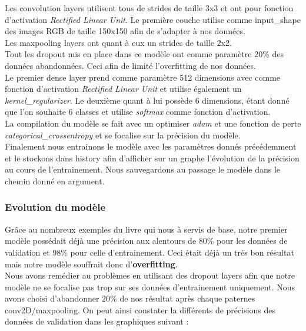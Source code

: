 \documentclass[12pt ,a4paper ]{article}
\begin{document}
\begin{multicols}{2}
Les convolution layers utilisent tous de strides de taille 3x3 et ont pour fonction d'activation \textit{Rectified Linear Unit}. Le première couche utilise comme input\_shape des images RGB de taille 150x150 afin de s'adapter à nos données.\\
Les maxpooling layers ont quant à eux un strides de taille 2x2.\\
Tout les dropout mis en place dans ce modèle ont comme paramètre 20\% des données abandonnées. Ceci afin de limité l'overfitting de nos données. \\
Le premier dense layer prend comme paramètre 512 dimensions avec comme fonction d'activation \textit{Rectified Linear Unit} et utilise également un \textit{kernel\_regularizer}. Le deuxième quant à lui possède 6 dimensions, étant donné que l'on souhaite 6 classes et utilise \textit{softmax} comme fonction d'activation. \\

La compilation du modèle se fait avec un optimiser \textit{adam} et une fonction de perte \textit{categorical\_crossentropy} et se focalise sur la précision du modèle. \\

Finalement nous entrainons le modèle avec les paramètres donnés précédemment et le stockons dans history afin d'afficher sur un graphe l'évolution de la précision au cours de l'entrainement. Nous sauvegardons au passage le modèle dans le chemin donné en argument. 

\subsubsection{Evolution du modèle}
Grâce au nombreux exemples du livre qui nous à servis de base, notre premier modèle possédait déjà une précision aux alentours de 80\% pour les données de validation et 98\% pour celle d'entrainement. Ceci était déjà un très bon résultat mais notre modèle souffrait donc d'\textbf{overfitting}.\\

Nous avons remédier au problèmes en utilisant des dropout layers afin que notre modèle ne se focalise pas trop sur ses données d'entrainement uniquement. Nous avons choisi d'abandonner 20\% de nos résultat après chaque paternes conv2D/maxpooling. On peut ainsi constater la différents de précisions des données de validation dans les graphiques suivant : 


\end{multicols}
\end{document}
